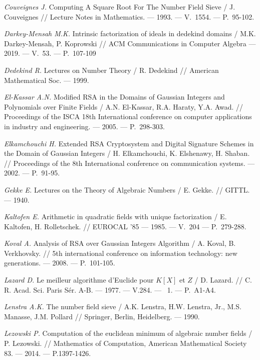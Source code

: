 \begin{thebibliography}{99}
    \textit{Couveignes J.} Computing A Square Root For The Number Field Sieve / J. Couveignes // Lecture Notes in Mathematics. — 1993. — V.~1554. — P.~95-102.

    \textit{Darkey-Mensah M.K.} Intrinsic factorization of ideals in dedekind domains / M.K. Darkey-Mensah, P. Koprowski // ACM Communications in Computer Algebra — 2019. — V.~53. — P.~107-109

    \textit{Dedekind R.} Lectures on Number Theory / R. Dedekind // American Mathematical Soc. — 1999.

    \textit{El-Kassar A.N.} Modified RSA in the Domains of Gaussian Integers and Polynomials over Finite Fields / A.N. El-Kassar, R.A. Haraty, Y.A. Awad. // Proceedings of the ISCA 18th International conference on computer applications in industry and engineering. — 2005. — P.~298-303.

    \textit{Elkamchouchi H.} Extended RSA Cryptosystem and Digital Signature Schemes in the Domain of Gaussian Integers / H. Elkamchouchi, K. Elshenawy, H. Shaban. // Proceedings of the 8th International conference on communication systems. — 2002. — P.~91-95.

    \textit{Gekke E.} Lectures on the Theory of Algebraic Numbers / E. Gekke. // GITTL. — 1940.
    
    \textit{Kaltofen E.} Arithmetic in quadratic fields with unique factorization / E. Kaltofen, H. Rolletschek. // EUROCAL '85 — 1985. — V.~204 — P.~279-288.

    \textit{Koval A.} Analysis of RSA over Gaussian Integers Algorithm / A. Koval, B. Verkhovsky. // 5th international conference on information technology: new generations. — 2008. — {P.}~101-105.
    
    \textit{Lazard D.} Le meilleur algorithme d'{E}uclide pour {$K[X]$} et {$Z$} / D. Lazard. // C. R. Acad. Sci. Paris S\'er. A-B. — 1977. — V.284. — \textnumero~1. — P.~A1-A4.
    
    \textit{Lenstra A.K.} The number field sieve / A.K. Lenstra, H.W. Lenstra, Jr., M.S. Manasse, J.M. Pollard // Springer, Berlin, Heidelberg. — 1990.

    \textit{Lezowski P.} Computation of the euclidean minimum of algebraic number fields / P. Lezowski. // Mathematics of Computation, American Mathematical Society 83. — 2014. — P.1397-1426.


\end{thebibliography}
